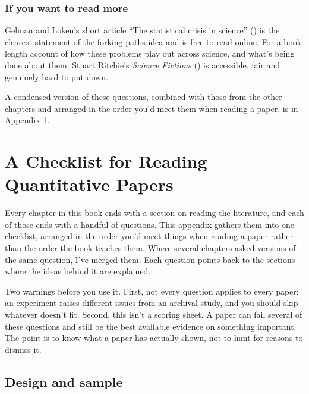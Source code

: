 \documentclass[
]{book}
\begin{document}
\subsection{If you want to read more}\label{if-you-want-to-read-more-9}

Gelman and Loken's short article ``The statistical crisis in science'' () is the clearest statement of the forking-paths idea and is free to read online. For a book-length account of how these problems play out across science, and what's being done about them, Stuart Ritchie's \emph{Science Fictions} () is accessible, fair and genuinely hard to put down.

A condensed version of these questions, combined with those from the other chapters and arranged in the order you'd meet them when reading a paper, is in Appendix \ref{reader-guide}.

\appendix


\chapter{A Checklist for Reading Quantitative Papers}\label{reader-guide}

Every chapter in this book ends with a section on reading the literature, and each of those ends with a handful of questions. This appendix gathers them into one checklist, arranged in the order you'd meet things when reading a paper rather than the order the book teaches them. Where several chapters asked versions of the same question, I've merged them. Each question points back to the sections where the ideas behind it are explained.

Two warnings before you use it. First, not every question applies to every paper: an experiment raises different issues from an archival study, and you should skip whatever doesn't fit. Second, this isn't a scoring sheet. A paper can fail several of these questions and still be the best available evidence on something important. The point is to know what a paper has actually shown, not to hunt for reasons to dismiss it.

\section{Design and sample}\label{design-and-sample}
\end{document}

